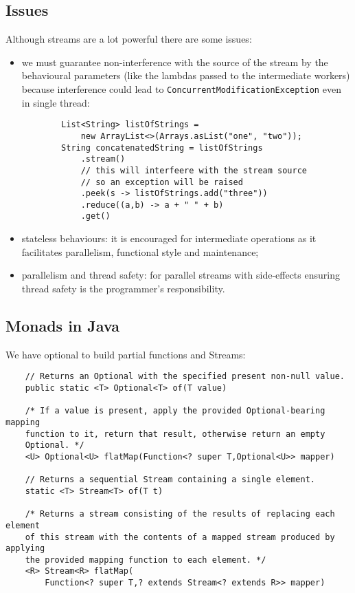 \subsection{Issues}
Although streams are a lot powerful there are some issues:
\begin{itemize}
    \item we must guarantee non-interference with the source of the stream by the behavioural parameters (like the lambdas passed to the intermediate workers) because interference could lead to \verb|ConcurrentModificationException| even in single thread:
    \begin{verbatim}
        List<String> listOfStrings = 
            new ArrayList<>(Arrays.asList("one", "two"));
        String concatenatedString = listOfStrings
            .stream()
            // this will interfeere with the stream source
            // so an exception will be raised
            .peek(s -> listOfStrings.add("three"))
            .reduce((a,b) -> a + " " + b)
            .get()
    \end{verbatim}

    \item stateless behaviours: it is encouraged for intermediate operations as it facilitates parallelism, functional style and maintenance;

    \item parallelism and thread safety: for parallel streams with side-effects ensuring thread safety is the programmer's responsibility.
\end{itemize}

\subsection{Monads in Java}
We have optional to build partial functions and Streams:
\begin{verbatim}
    // Returns an Optional with the specified present non-null value.
    public static <T> Optional<T> of(T value)

    /* If a value is present, apply the provided Optional-bearing mapping
    function to it, return that result, otherwise return an empty
    Optional. */
    <U> Optional<U> flatMap(Function<? super T,Optional<U>> mapper)

    // Returns a sequential Stream containing a single element.
    static <T> Stream<T> of(T t)

    /* Returns a stream consisting of the results of replacing each element
    of this stream with the contents of a mapped stream produced by applying
    the provided mapping function to each element. */
    <R> Stream<R> flatMap(
        Function<? super T,? extends Stream<? extends R>> mapper)
\end{verbatim}


